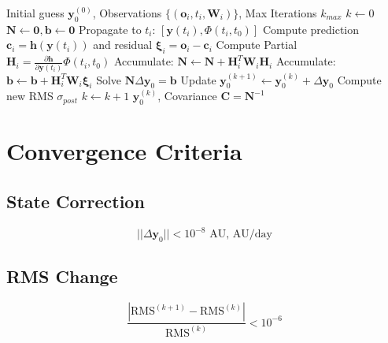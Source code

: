 \begin{algorithm}
\caption{Differential Correction (Newton-Raphson)}
\begin{algorithmic}[1]
\REQUIRE Initial guess $\mathbf{y}_0^{(0)}$, Observations $\{(\mathbf{o}_i, t_i, \mathbf{W}_i)\}$, Max Iterations $k_{max}$
\STATE $k \leftarrow 0$
\REPEAT
    \STATE $\mathbf{N} \leftarrow \mathbf{0}, \mathbf{b} \leftarrow \mathbf{0}$
        \STATE Propagate to $t_i$: $[\mathbf{y}(t_i), \Phi(t_i, t_0)]$
        \STATE Compute prediction $\mathbf{c}_i = \mathbf{h}(\mathbf{y}(t_i))$ and residual $\boldsymbol{\xi}_i = \mathbf{o}_i - \mathbf{c}_i$
        \STATE Compute Partial $\mathbf{H}_i = \frac{\partial \mathbf{h}}{\partial \mathbf{y}(t_i)} \Phi(t_i, t_0)$
        \STATE Accumulate: $\mathbf{N} \leftarrow \mathbf{N} + \mathbf{H}_i^T \mathbf{W}_i \mathbf{H}_i$
        \STATE Accumulate: $\mathbf{b} \leftarrow \mathbf{b} + \mathbf{H}_i^T \mathbf{W}_i \boldsymbol{\xi}_i$
    \ENDFOR
    \STATE Solve $\mathbf{N} \Delta \mathbf{y}_0 = \mathbf{b}$
    \STATE Update $\mathbf{y}_0^{(k+1)} \leftarrow \mathbf{y}_0^{(k)} + \Delta \mathbf{y}_0$
    \STATE Compute new RMS $\sigma_{post}$
    \STATE $k \leftarrow k+1$
\RETURN $\mathbf{y}_0^{(k)}$, Covariance $\mathbf{C} = \mathbf{N}^{-1}$
\end{algorithmic}
\end{algorithm}

\section{Convergence Criteria}

\subsection{State Correction}

\begin{equation}
    ||\Delta\mathbf{y}_0|| < 10^{-8} \text{ AU, AU/day}
\end{equation}

\subsection{RMS Change}

\begin{equation}
    \frac{|\text{RMS}^{(k+1)} - \text{RMS}^{(k)}|}{\text{RMS}^{(k)}} < 10^{-6}
\end{equation}

